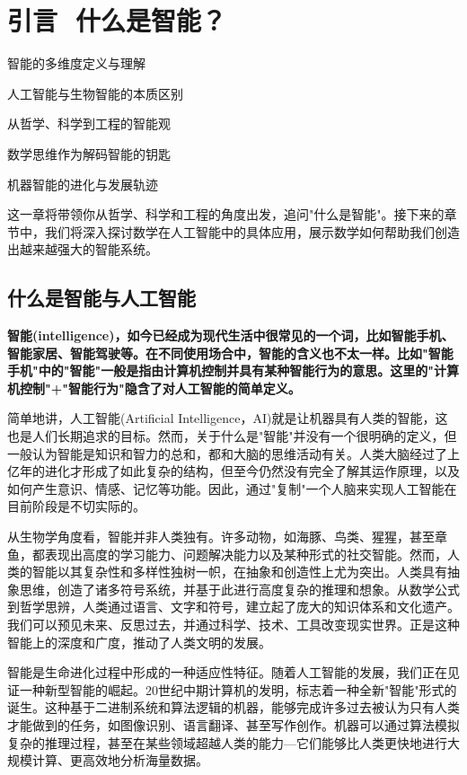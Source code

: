 \chapter*{ 引言\,\,  什么是智能？}
 \begin{introduction}
  \item 智能的多维度定义与理解
  \item 人工智能与生物智能的本质区别
  \item 从哲学、科学到工程的智能观
  \item 数学思维作为解码智能的钥匙
  \item 机器智能的进化与发展轨迹
\end{introduction}


这一章将带领你从哲学、科学和工程的角度出发，追问"什么是智能"。接下来的章节中，我们将深入探讨数学在人工智能中的具体应用，展示数学如何帮助我们创造出越来越强大的智能系统。

\section{什么是智能与人工智能}

{\textbf{智能(intelligence)，如今已经成为现代生活中很常见的一个词，比如智能手机、智能家居、智能驾驶等。在不同使用场合中，智能的含义也不太一样。比如"智能手机"中的"智能"一般是指由计算机控制并具有某种智能行为的意思。这里的"计算机控制"+"智能行为"隐含了对人工智能的简单定义。}}

简单地讲，人工智能(Artificial Intelligence，AI)就是让机器具有人类的智能，这也是人们长期追求的目标。然而，关于什么是"智能"并没有一个很明确的定义，但一般认为智能是知识和智力的总和，都和大脑的思维活动有关。人类大脑经过了上亿年的进化才形成了如此复杂的结构，但至今仍然没有完全了解其运作原理，以及如何产生意识、情感、记忆等功能。因此，通过"复制"一个人脑来实现人工智能在目前阶段是不切实际的。

从生物学角度看，智能并非人类独有。许多动物，如海豚、鸟类、猩猩，甚至章鱼，都表现出高度的学习能力、问题解决能力以及某种形式的社交智能。然而，人类的智能以其复杂性和多样性独树一帜，在抽象和创造性上尤为突出。人类具有抽象思维，创造了诸多符号系统，并基于此进行高度复杂的推理和想象。从数学公式到哲学思辨，人类通过语言、文字和符号，建立起了庞大的知识体系和文化遗产。我们可以预见未来、反思过去，并通过科学、技术、工具改变现实世界。正是这种智能上的深度和广度，推动了人类文明的发展。

智能是生命进化过程中形成的一种适应性特征。随着人工智能的发展，我们正在见证一种新型智能的崛起。20世纪中期计算机的发明，标志着一种全新"智能"形式的诞生。这种基于二进制系统和算法逻辑的机器，能够完成许多过去被认为只有人类才能做到的任务，如图像识别、语言翻译、甚至写作创作。机器可以通过算法模拟复杂的推理过程，甚至在某些领域超越人类的能力---它们能够比人类更快地进行大规模计算、更高效地分析海量数据。


